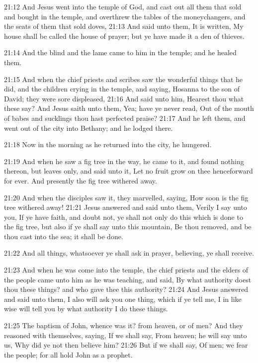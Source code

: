 21:12 And Jesus went into the temple of God, and cast out all them that sold and bought in the temple, and overthrew the tables of the moneychangers, and the seats of them that sold doves, 21:13 And said unto them, It is written, My house shall be called the house of prayer; but ye have made it a den of thieves.

21:14 And the blind and the lame came to him in the temple; and he healed them.

21:15 And when the chief priests and scribes saw the wonderful things that he did, and the children crying in the temple, and saying, Hosanna to the son of David; they were sore displeased, 21:16 And said unto him, Hearest thou what these say? And Jesus saith unto them, Yea; have ye never read, Out of the mouth of babes and sucklings thou hast perfected praise?  21:17 And he left them, and went out of the city into Bethany; and he lodged there.

21:18 Now in the morning as he returned into the city, he hungered.

21:19 And when he saw a fig tree in the way, he came to it, and found nothing thereon, but leaves only, and said unto it, Let no fruit grow on thee henceforward for ever. And presently the fig tree withered away.

21:20 And when the disciples saw it, they marvelled, saying, How soon is the fig tree withered away!  21:21 Jesus answered and said unto them, Verily I say unto you, If ye have faith, and doubt not, ye shall not only do this which is done to the fig tree, but also if ye shall say unto this mountain, Be thou removed, and be thou cast into the sea; it shall be done.

21:22 And all things, whatsoever ye shall ask in prayer, believing, ye shall receive.

21:23 And when he was come into the temple, the chief priests and the elders of the people came unto him as he was teaching, and said, By what authority doest thou these things? and who gave thee this authority?  21:24 And Jesus answered and said unto them, I also will ask you one thing, which if ye tell me, I in like wise will tell you by what authority I do these things.

21:25 The baptism of John, whence was it? from heaven, or of men? And they reasoned with themselves, saying, If we shall say, From heaven; he will say unto us, Why did ye not then believe him?  21:26 But if we shall say, Of men; we fear the people; for all hold John as a prophet.

